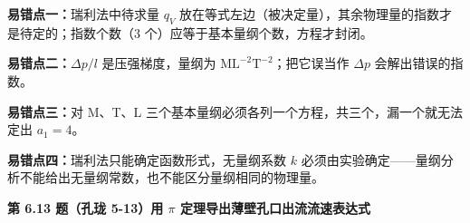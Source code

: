 \begin{yicuo}
\textbf{易错点一：}瑞利法中待求量 $q_V$ 放在等式左边（被决定量），其余物理量的指数才是待定的；指数个数（3 个）应等于基本量纲个数，方程才封闭。

\textbf{易错点二：}$\Delta p/l$ 是压强梯度，量纲为 $\mathrm{ML^{-2}T^{-2}}$；把它误当作 $\Delta p$ 会解出错误的指数。

\textbf{易错点三：}对 M、T、L 三个基本量纲必须各列一个方程，共三个，漏一个就无法定出 $a_1=4$。

\textbf{易错点四：}瑞利法只能确定函数形式，无量纲系数 $k$ 必须由实验确定——量纲分析不能给出无量纲常数，也不能区分量纲相同的物理量。
\end{yicuo}

\noindent\textbf{第 6.13 题（孔珑 5-13）\quad 用 $\pi$ 定理导出薄壁孔口出流流速表达式}

